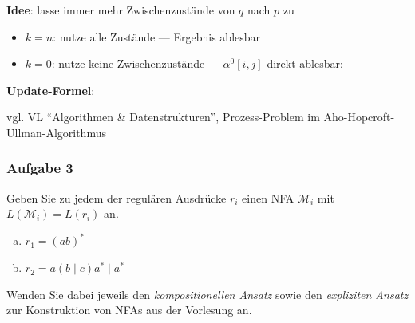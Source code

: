 \documentclass{beamer}
\begin{document}
	\begin{frame}
		\small
		\textbf{Idee}: lasse immer mehr Zwischenzustände von $q$ nach $p$ zu \\
		\begin{itemize}
			\item $k = n$: nutze alle Zustände --- Ergebnis ablesbar
			\item $k = 0$: nutze keine Zwischenzustände --- $\alpha^0[i,j]$ direkt ablesbar:
		\end{itemize}
	
		\textbf{Update-Formel}:
	
		\begin{itshape}
			\scriptsize
			vgl. VL \enquote{Algorithmen \& Datenstrukturen}, Prozess-Problem im Aho-Hopcroft-Ullman-Algorithmus
		\end{itshape}
	\end{frame}

	\begin{frame} \frametitle{Aufgabe 3}
		\small
		Geben Sie zu jedem der regulären Ausdrücke $r_i$ einen 
		NFA $\mathcal M_i$ mit $L(\mathcal M_i) = L(r_i)$ an.
		
		\begin{enumerate}[a)]
			\item $r_1 = (ab)^\ast$
			\item $r_2 = a(b \mid c)a^\ast \mid a^\ast$
		\end{enumerate}
		
		Wenden Sie dabei jeweils den \textit{kompositionellen Ansatz} sowie den \textit{expliziten Ansatz} zur Konstruktion von NFAs aus der Vorlesung an.
	\end{frame}
\end{document}
